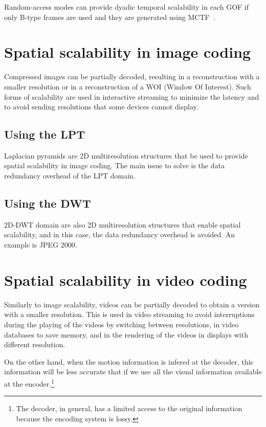 Random-access modes can provide dyadic temporal scalability in each
GOF if only B-type frames are used and they are generated using
MCTF~\cite{vruiz__MCTF}.

\section{Spatial scalability in image coding}

Compressed images can be partially decoded, resulting in a
reconstruction with a smaller resolution or in a reconstruction of a
WOI (Window Of Interest). Such forms of scalability are used in
interactive streaming to minimize the latency and to avoid sending
resolutions that some devices cannot display.

\subsection{Using the LPT}

Laplacian pyramids are 2D multiresolution structures that be used to
provide spatial scalability in image coding. The main issue to solve
is the data redundancy overhead of the LPT domain.

\subsection{Using the DWT}

2D-DWT domain are also 2D multiresolution structures that enable
spatial scalability, and in this case, the data redundancy overhead is
avoided. An example is JPEG 2000.

\section{Spatial scalability in video coding}

Similarly to image scalability, videos can be partially decoded to
obtain a version with a smaller resolution. This is used in video
streaming to avoid interruptions during the playing of the videos by
switching between resolutions, in video databases to save memory, and
in the rendering of the videos in displays with different resolution.

On the other hand, when the motion information is infered at the
decoder, this information will be less accurate that if we use all the
visual information available at the encoder.\footnote{The decoder, in
general, has a limited access to the original information because the
encoding system is lossy.}

